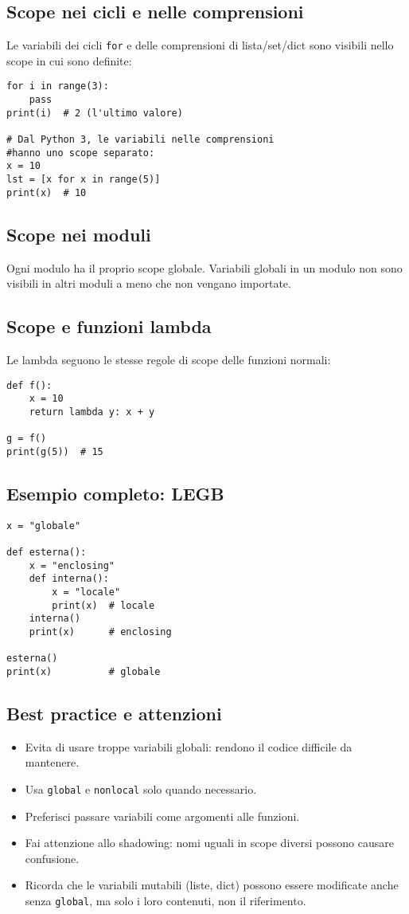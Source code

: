 \documentclass[a4paper,12pt]{article}
\begin{document}
\subsection*{Scope nei cicli e nelle comprensioni}
Le variabili dei cicli \texttt{for} e delle comprensioni di lista/set/dict sono visibili nello scope in cui sono definite:
\begin{lstlisting}
for i in range(3):
    pass
print(i)  # 2 (l'ultimo valore)

# Dal Python 3, le variabili nelle comprensioni
#hanno uno scope separato:
x = 10
lst = [x for x in range(5)]
print(x)  # 10
\end{lstlisting}

\subsection*{Scope nei moduli}
Ogni modulo ha il proprio scope globale. Variabili globali in un modulo non sono visibili in altri moduli a meno che non vengano importate.

\subsection*{Scope e funzioni lambda}
Le lambda seguono le stesse regole di scope delle funzioni normali:
\begin{lstlisting}
def f():
    x = 10
    return lambda y: x + y

g = f()
print(g(5))  # 15
\end{lstlisting}

\subsection*{Esempio completo: LEGB}
\begin{lstlisting}
x = "globale"

def esterna():
    x = "enclosing"
    def interna():
        x = "locale"
        print(x)  # locale
    interna()
    print(x)      # enclosing

esterna()
print(x)          # globale
\end{lstlisting}

\subsection*{Best practice e attenzioni}
\begin{itemize}
    \item Evita di usare troppe variabili globali: rendono il codice difficile da mantenere.
    \item Usa \texttt{global} e \texttt{nonlocal} solo quando necessario.
    \item Preferisci passare variabili come argomenti alle funzioni.
    \item Fai attenzione allo shadowing: nomi uguali in scope diversi possono causare confusione.
    \item Ricorda che le variabili mutabili (liste, dict) possono essere modificate anche senza \texttt{global}, ma solo i loro contenuti, non il riferimento.
\end{itemize}
\end{document}
